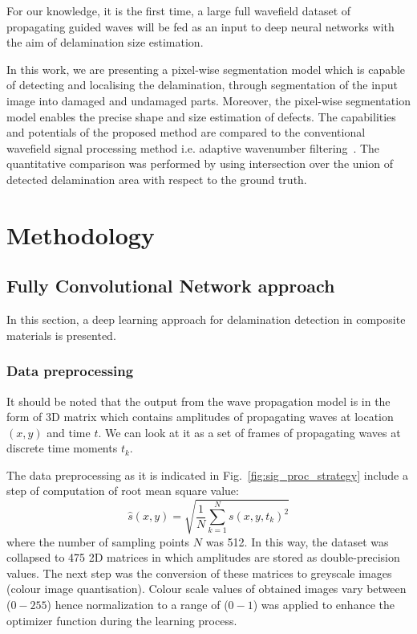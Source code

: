\documentclass[preprint,9pt]{elsarticle}
\begin{document}
For our knowledge, it is the first time, a large full wavefield dataset of propagating guided waves will be fed as an input to deep neural networks with the aim of delamination size estimation.

In this work, we are presenting a pixel-wise segmentation model which is capable of detecting and localising the delamination, through segmentation of the input image into damaged and undamaged parts.
Moreover, the pixel-wise segmentation model enables the precise shape and size estimation of defects.
The capabilities and potentials of the proposed method are compared to the conventional wavefield signal processing method i.e. adaptive wavenumber filtering~\cite{Kudela2015,Radzienski2019}.
The quantitative comparison was performed by using intersection over the union of detected delamination area with respect to the ground truth. 

	\section{Methodology}
	
	
	

	\subsection{Fully Convolutional Network approach}
	In this section, a deep learning approach for delamination detection in composite materials is presented. 
	\subsubsection{Data preprocessing}
	It should be noted that the output from the wave propagation model is in the form of 3D matrix which contains amplitudes of propagating waves at location \((x, y)\) and time \(t\). We can look at it as a set of frames of propagating waves at discrete time moments \(t_k\).

	The data preprocessing as it is indicated in Fig.~\ref{fig:sig_proc_strategy} include a step of computation of root mean square value:
	\begin{equation}
		\hat{s}(x,y) = \sqrt{\frac{1}{N}\sum_{k=1}^{N} s(x,y,t_k)^2}
		\label{eq:rms}
	\end{equation}
	where the number of sampling points \(N\) was 512.
	In this way, the dataset was collapsed to 475 2D matrices in which amplitudes are stored as double-precision values.
	The next step was the conversion of these matrices to greyscale images (colour image quantisation).
	Colour scale values of obtained images vary between (\(0 - 255\)) hence normalization
	to a range of (\(0-1\)) was applied to enhance the optimizer function during the learning process. 
	
\end{document}
